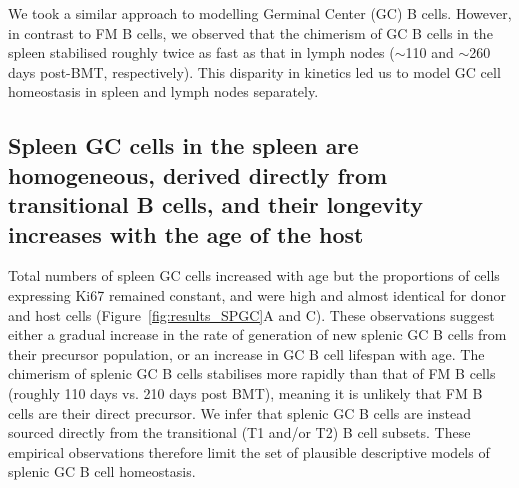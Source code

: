 \documentclass[11pt]{article}
\newcommand{\red}[1]{{\color{red}{#1}}}
\begin{document}
	We took a similar approach to modelling Germinal Center (GC) B cells. However, in contrast to FM B cells, we observed that the chimerism of GC B cells in the spleen stabilised roughly twice as fast as that in lymph nodes ($\sim$110 and $\sim$260 days post-BMT, respectively). This disparity in  kinetics led us to model  GC cell homeostasis in spleen and lymph nodes separately.





\red{	We assumed a constant rate of source influx in both spleen and LN GC pools and allowed our models to be strongly informed by the rate of turnover ($\lambda$) observed in Ki67-CreER-YFP reporter mice. Additionally, we found that recently divided YFP-tagged splenic GC cells were lost twice as fast as LN GC cells in Ki67-CreER-YFP reporter mice (half life 11 vs 20 days respectively, details in the Methods?).}

	
	
	\subsection*{Spleen GC cells in the spleen are homogeneous, derived directly from transitional B cells, and their longevity increases with the age of the host}
	Total numbers of spleen GC cells increased with age but the proportions of  cells expressing Ki67 remained constant, and were high and almost identical for donor and host cells (Figure~\ref{fig:results_SPGC}A and C). These observations suggest either a gradual increase in the rate of generation of new splenic GC B cells from their precursor population, or an increase in GC B cell lifespan with age. The chimerism of splenic GC B cells stabilises more rapidly than that of FM B cells (roughly 110 days vs. 210 days post BMT), meaning it is unlikely that FM B cells are their direct precursor. We infer that splenic GC B cells are instead sourced directly from the transitional (T1 and/or T2) B cell subsets.  These empirical observations therefore limit the set of plausible descriptive models of splenic GC B cell homeostasis.
\end{document}
